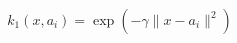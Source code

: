 \documentclass[preview]{standalone}
\begin{document}
\[
    k_1(x,a_i)=\exp(-\gamma\lVert x-a_i\rVert^2)
\]
\end{document}
